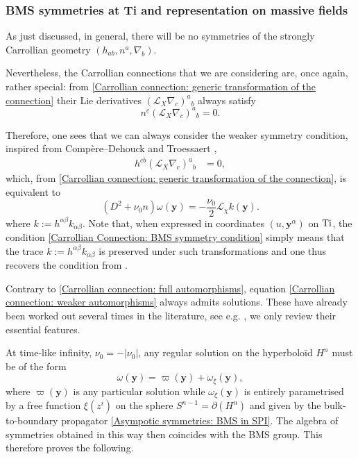 \documentclass[a4paper, 10pt]{article}
\theoremstyle{remark}
\newcommand{\Ti}{\textnormal{Ti}}
\newcommand{\y}{\bm{y}}
\begin{document}
\subsubsection{BMS symmetries at Ti and representation on massive fields}

As just discussed, in general, there will be no symmetries of the strongly Carrollian geometry $(h_{ab}, n^a ,\nabla_b)$. 

Nevertheless, the Carrollian connections that we are considering are, once again, rather special: from \eqref{Carrollian connection: generic transformation of the connection} their Lie derivatives $(\mathcal{L}_X\nabla_c)^a{}_b$ always satisfy
\begin{equation*}
    n^c(\mathcal{L}_X\nabla_c)^a{}_b =0.
\end{equation*}

Therefore, one sees that we can always consider the weaker symmetry condition, inspired from Compère--Dehouck \cite{Compere:2011ve} and Troessaert \cite{troessaert_bms4_2018},
 \begin{align}\label{Carrollian Connection: BMS symmetry condition}
h^{cb}(\mathcal{L}_X\nabla_c)^a{}_b &=0,
\end{align}
which, from  \eqref{Carrollian connection: generic transformation of the connection}, is equivalent to
\begin{equation}\label{Carrollian connection: weaker automorphisms}
( D^2 + \nu_0 n) \omega(\y) = -\frac{\nu_0}{2} \mathcal{L}_{\chi} k(\y).
\end{equation}
where $k:= h^{\alpha\beta}k_{\alpha \beta}$. Note that, when expressed in coordinates $(u,\y^{\alpha})$ on $\Ti$, the condition \eqref{Carrollian Connection: BMS symmetry condition} simply means that the trace $k:= h^{\alpha\beta}k_{\alpha \beta}$ is preserved under such transformations and one thus recovers the condition from \cite{Compere:2011ve,troessaert_bms4_2018}.

Contrary to \eqref{Carrollian connection: full automorphisms}, equation \eqref{Carrollian connection: weaker automorphisms} always admits solutions. These have already been worked out several times in the literature, see e.g. \cite{Compere:2023qoa}, we only review their essential features.

At time-like infinity, $\nu_0=-|\nu_0|$, any regular solution on the hyperboloïd $H^n$ must be of the form
\begin{equation*}
    \omega(\y) = \varpi(\y) + \omega_\xi(\y),
\end{equation*}
where $\varpi(\y)$ is any particular solution while $\omega_{\xi}(\y)$ is entirely parametrised by a free function $\xi(z^i)$ on the sphere $S^{n-1} = \partial(H^n)$ and given by the bulk-to-boundary propagator \eqref{Asympotic symmetries: BMS in SPI}.  The algebra of symmetries obtained in this way then coincides with the BMS group. This therefore proves the following.
\end{document}
